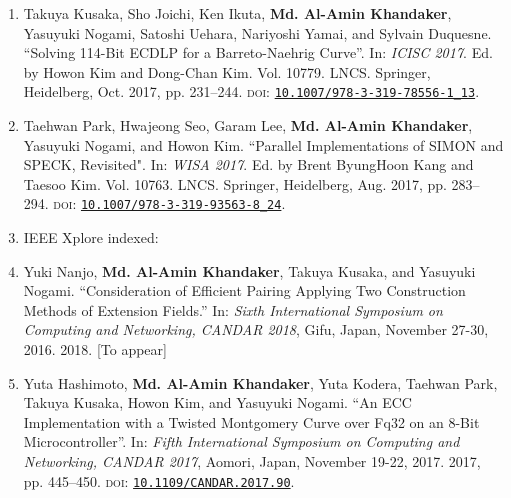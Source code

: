 \begin{enumerate}
	\item Takuya Kusaka, Sho Joichi, Ken Ikuta, \textbf{Md. Al-Amin Khandaker}, \\ Yasuyuki Nogami, Satoshi Uehara, Nariyoshi Yamai, and Sylvain Duquesne. ``Solving 114-Bit ECDLP for a Barreto-Naehrig Curve''. In: \textit{ICISC 2017}. Ed. by Howon Kim and Dong-Chan Kim. Vol. 10779. LNCS. Springer, Heidelberg, Oct. 2017, pp. 231–244. \textsc{doi}: \href{https://doi.org/10.1007/978-3-319-78556-1_13}{\texttt{10.1007/978-3-319-78556-1\_13}}.
	
	\item  Taehwan Park, Hwajeong Seo, Garam Lee,\textbf{ Md. Al-Amin Khandaker}, \\Yasuyuki Nogami, and Howon Kim. ``Parallel Implementations of SIMON and SPECK, Revisited". In: \textit{WISA 2017}. Ed. by Brent ByungHoon Kang and Taesoo Kim. Vol. 10763. LNCS. Springer, Heidelberg, Aug. 2017, pp. 283–294. \textsc{doi}: \href{https://doi.org/10.1007/978-3-319-93563-8_24}{\texttt{10.1007/978-3-319-93563-8\_24}}.  
	
		\vspace{5mm}
	\item[ ] \Large IEEE Xplore indexed:
	\normalsize
	

	\item Yuki Nanjo, \textbf{Md. Al-Amin Khandaker}, Takuya Kusaka, and Yasuyuki Nogami. ``Consideration of Efficient Pairing Applying Two Construction Methods of Extension Fields.'' In:  \textit{Sixth International Symposium on Computing and Networking, CANDAR 2018}, Gifu, Japan, November 27-30, 2016. 2018. [To appear]
	
	\item Yuta Hashimoto, \textbf{Md. Al-Amin Khandaker}, Yuta Kodera, Taehwan Park, Takuya Kusaka, Howon Kim, and Yasuyuki Nogami. ``An ECC Implementation with a Twisted Montgomery Curve over Fq32 on an 8-Bit Microcontroller''. In: \textit{Fifth International Symposium on Computing and Networking, CANDAR 2017}, Aomori, Japan, November 19-22, 2017. 2017, pp. 445–450. \textsc{doi}: \href{https://doi.org/10.1109/CANDAR.2017.90}{\texttt{10.1109/CANDAR.2017.90}}.
	


\end{enumerate}
